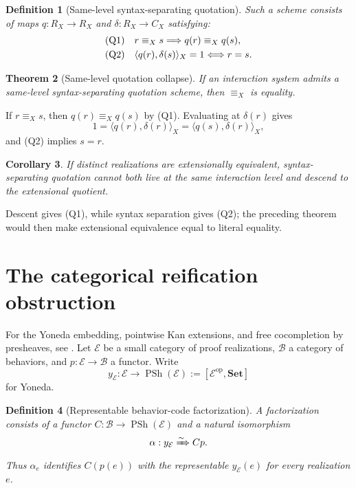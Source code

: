 \documentclass[12pt,a4paper,twoside]{extarticle}
\makeatletter
\theoremstyle{compactplain}
\newtheorem{theorem}{Theorem}[section]
\newtheorem{corollary}[theorem]{Corollary}
\theoremstyle{compactdef}
\newtheorem{definition}[theorem]{Definition}
\renewenvironment{proof}[1][\proofname]{\par\pushQED{\qed}\normalfont
  \topsep2pt\trivlist\item[\hskip\labelsep\bfseries #1\@addpunct{.}]\ignorespaces}
 {\popQED\endtrivlist\@endpefalse}
\newcommand{\PSh}{\operatorname{PSh}}
\makeatother
\begin{document}
\begin{definition}[Same-level syntax-separating quotation]
Such a scheme consists of maps $q:R_X\to R_X$ and $\delta:R_X\to C_X$ satisfying:
\begin{align*}
\textnormal{(Q1)}&\quad r\equiv_X s\Longrightarrow q(r)\equiv_X q(s),\\
\textnormal{(Q2)}&\quad \langle q(r),\delta(s)\rangle_X=1\Longleftrightarrow r=s.
\end{align*}
\end{definition}

\begin{theorem}[Same-level quotation collapse]
If an interaction system admits a same-level syntax-separating quotation scheme, then $\equiv_X$ is equality.
\end{theorem}
\begin{proof}
If $r\equiv_X s$, then $q(r)\equiv_X q(s)$ by (Q1). Evaluating at $\delta(r)$ gives
\[
1=\langle q(r),\delta(r)\rangle_X=\langle q(s),\delta(r)\rangle_X,
\]
and (Q2) implies $s=r$.
\end{proof}

\begin{corollary}
If distinct realizations are extensionally equivalent, syntax-separating quotation cannot both live at the same interaction level and descend to the extensional quotient.
\end{corollary}
\begin{proof}
Descent gives (Q1), while syntax separation gives (Q2); the preceding theorem would then make extensional equivalence equal to literal equality.
\end{proof}
\section{The categorical reification obstruction}\label{sec:yoneda-obstruction}
For the Yoneda embedding, pointwise Kan extensions, and free cocompletion by presheaves, see \cite{maclane,maclane-moerdijk}.
Let $\mathcal E$ be a small category of proof realizations, $\mathcal B$ a category of behaviors, and $p:\mathcal E\to\mathcal B$ a functor. Write
\[
y_{\mathcal E}:\mathcal E\to\PSh(\mathcal E):=[\mathcal E^{\mathrm{op}},\mathbf{Set}]
\]
for Yoneda.

\begin{definition}[Representable behavior-code factorization]
A factorization consists of a functor $C:\mathcal B\to\PSh(\mathcal E)$ and a natural isomorphism
\[
\alpha:y_{\mathcal E}\xRightarrow{\sim}Cp.
\]
Thus $\alpha_e$ identifies $C(p(e))$ with the representable $y_{\mathcal E}(e)$ for every realization $e$.
\end{definition}
\end{document}
